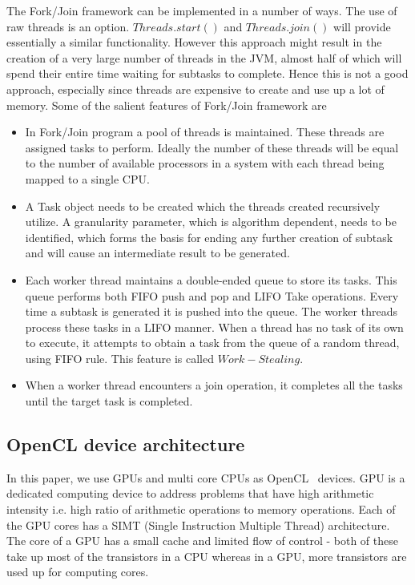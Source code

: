 \documentclass[conference]{IEEEtran}
\begin{document}
The Fork/Join framework can be implemented in a number of ways. The use of raw threads is an option. $Threads.start()$ and $Threads.join()$ will provide essentially a similar functionality. However this approach might result in the creation of a very large number of threads in the JVM, almost half of which will spend their entire time waiting for subtasks to complete. Hence this is not a good approach, especially since threads are expensive to create and use up a lot of memory. Some of the salient features of Fork/Join framework are

\begin{itemize}
\item{In Fork/Join program a pool of threads is maintained. These threads are assigned tasks to perform. Ideally the number of these threads will be equal to the number of available processors in a system with each thread being mapped to a single CPU.}
\item{A Task object needs to be created which the threads created recursively utilize.  A granularity parameter, which is algorithm dependent, needs to be identified, which forms the basis for ending any further creation of subtask and will cause an intermediate result to be generated.}
\item{Each worker thread maintains a double-ended queue to store its tasks. This queue performs both FIFO push and pop and LIFO Take operations. Every time a subtask is generated it is pushed into the queue. The worker threads process these tasks in a LIFO manner. When a thread has no task of its own to execute, it attempts to obtain a task from the queue of a random thread, using FIFO rule. This feature is called $Work-Stealing$.}
\item{When a worker thread encounters a join operation, it completes all the tasks until the target task is completed.}
\end{itemize}


\subsection{ OpenCL device architecture} \label{sec:gpuArch}

In this paper, we use GPUs and multi core CPUs as OpenCL~\cite{bib:ocl} devices. GPU is a dedicated computing device to address problems that have high arithmetic intensity i.e. high ratio of arithmetic operations to memory operations. Each of the GPU cores has a SIMT (Single Instruction Multiple Thread) architecture. The core of a GPU has a small cache and limited flow of control - both of these take up most of the transistors in a CPU whereas in a GPU, more transistors are used up for computing cores.
\end{document}
